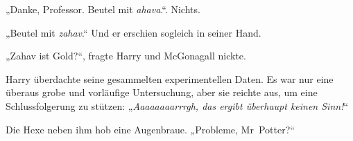 „Danke, Professor. Beutel mit \emph{ahava}.“. Nichts.

„Beutel mit \emph{zahav}.“ Und er erschien sogleich in seiner Hand.

„Zahav ist Gold?“, fragte Harry und McGonagall nickte.



Harry überdachte seine gesammelten experimentellen Daten. Es war nur eine überaus grobe und vorläufige Untersuchung, aber sie reichte aus, um eine Schlussfolgerung zu stützen: „\emph{Aaaaaaaarrrgh, das ergibt überhaupt keinen Sinn!}“

Die Hexe neben ihm hob eine Augenbraue. „Probleme, Mr~Potter?“

